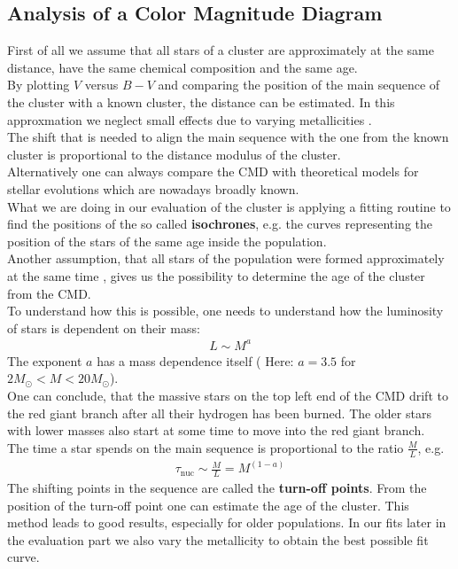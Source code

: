 \subsection{Analysis of a Color Magnitude Diagram}
First of all we assume that all stars of a cluster are approximately at the same distance, have the same chemical composition and the same age. \\
By plotting $V$ versus $B-V$ and comparing the position of the main sequence of the cluster with a known cluster, the distance can be estimated. In this approxmation we neglect small effects due to varying metallicities . \\
The shift that is needed to align the main sequence with the one from the known cluster is proportional to the distance modulus of the cluster. \\
Alternatively one can always compare the CMD with theoretical models for stellar evolutions which are nowadays broadly known. \\
What we are doing in our evaluation of the cluster is applying a fitting routine to find the positions of the so called \textbf{isochrones}, e.g. the curves representing the position of the stars of the same age inside the population. \\
Another assumption, that all stars of the population were  formed approximately at the same time , gives us the possibility to determine the age of the cluster from the CMD. \\
To understand how this is possible, one needs to understand how the luminosity of stars is dependent on their mass:
\begin{align}
	L \sim M^a
\end{align}
 The exponent $a$ has a mass dependence itself ( Here: $a = 3.5 $ for $2M_{\odot} < M < 20M_{\odot}$). \\ One can conclude, that the massive stars on the top left end of the CMD drift to the red giant branch after all their hydrogen has been burned. The older stars with lower masses also start at some time to move into the red giant branch. \\
 The time a star spends on the main sequence is proportional to the ratio $\frac{M}{L}$, e.g.
 \begin{align}
 	\tau_{\text{nuc}} \sim \frac{M}{L} = M^{(1-a)}
 \end{align}
 The shifting points in the sequence are called the \textbf{turn-off points}. From the position of the turn-off point one can estimate the age of the cluster. This method leads to good results, especially for older populations. In our fits later in the evaluation part we also vary the metallicity to obtain the best possible fit curve. 
